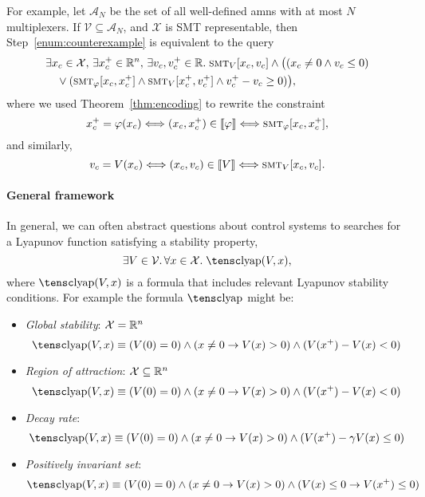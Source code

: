 \documentclass[10pt]{article}
\newcommand{\amn}{\varphi}
\newcommand{\Graph}[1]{\llbracket #1 \rrbracket}
\newcommand{\smt}{\mbox{\sc smt}}
\theoremstyle{remark}
\theoremstyle{definition}
\theoremstyle{plain}
\begin{document}
For example, let $\mathcal{A}_N$ be the set of all well-defined \acs{amn}s with
at most $N$ multiplexers. If $\mathcal{V}\subseteq\mathcal{A}_N$, and
$\mathcal{X}$ is SMT representable, then Step~\ref{enum:counterexample} is
equivalent to the query
\[
	\begin{aligned}
	& \exists x_c\in\mathcal{X},\,\exists x_c^+ \in\reals^n,\, \exists v_c, v_c^+\in\reals .\;
		\smt_{V}[x_c,v_c] \wedge \big((x_c \neq 0 \wedge v_c \leq 0)\\
	& \quad \vee 
		(\smt_{\amn}[x_c,x_c^+] \wedge \smt_{V}[x_c^+,v_c^+]
		 \wedge v_c^+ - v_c \geq 0)\big),
	\end{aligned}
\]
where we used Theorem~\ref{thm:encoding} to rewrite the constraint
\[
	x_c^+ = \amn(x_c) 
	\Longleftrightarrow 
	(x_c, x_c^+) \in \Graph{\amn}
	\Longleftrightarrow
	\smt_{\amn}[x_c,x_c^+],
\]
and similarly,
\[
	v_c = V(x_c)
	\Longleftrightarrow 
	(x_c, v_c) \in \Graph{V}
	\Longleftrightarrow
	\smt_{V}[x_c,v_c].
\]

\paragraph{General framework}
In general, we can often abstract questions about control systems to searches
for a Lyapunov function satisfying a stability property,
\begin{equation}
	\label{eq:ef_lyapunov}
	\exists V \in \mathcal{V} .\, \forall x\in\mathcal{X} .\;
	\mathsc{lyap}(V,x),
\end{equation}
where $\mathsc{lyap}(V,x)$ is a formula that includes relevant Lyapunov
stability conditions. For example the formula $\mathsc{lyap}$ might be:
\begin{itemize}
	\item \emph{Global stability}: $\mathcal{X}=\mathbb{R}^n$
	\[
		\mathsc{lyap}(V,x)
		\equiv
		(V(0) = 0)
		\wedge (x \neq 0 \rightarrow V(x) > 0) 
		\wedge (V(x^+) - V(x) < 0)
	\]
	\item \emph{Region of attraction}: $\mathcal{X}\subseteq\mathbb{R}^n$
	\[
		\mathsc{lyap}(V,x)
		\equiv
		(V(0) = 0)
		\wedge (x \neq 0 \rightarrow V(x) > 0) 
		\wedge (V(x^+) - V(x) < 0)
	\]
	\item \emph{Decay rate}:
	\[
		\mathsc{lyap}(V,x)
		\equiv
		(V(0) = 0)
		\wedge (x \neq 0 \rightarrow V(x) > 0) 
		\wedge (V(x^+) - \gamma V(x) \leq 0)
	\]
	\item \emph{Positively invariant set}:
	\[
		\mathsc{lyap}(V,x)
		\equiv
		(V(0) = 0)
		\wedge (x \neq 0 \rightarrow V(x) > 0) 
		\wedge (V(x) \leq 0 \rightarrow V(x^+) \leq 0)
	\]
\end{itemize}
\end{document}
